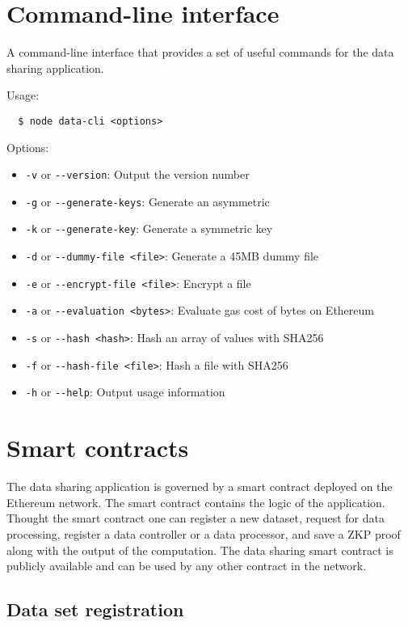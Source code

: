 \section{Command-line interface}
\label{implemenation:cli}

A command-line interface that provides a set of useful commands for the data sharing application.

Usage:

\begin{verbatim}
  $ node data-cli <options>
\end{verbatim}

Options:

\begin{itemize}
  \item \verb|-v| or \verb|--version|: Output the version number
  \item \verb|-g| or \verb|--generate-keys|: Generate an asymmetric
  \item \verb|-k| or \verb|--generate-key|: Generate a symmetric key
  \item \verb|-d| or \verb|--dummy-file <file>|: Generate a 45MB dummy file
  \item \verb|-e| or \verb|--encrypt-file <file>|: Encrypt a file
  \item \verb|-a| or \verb|--evaluation <bytes>|: Evaluate gas cost of bytes on Ethereum
  \item \verb|-s| or \verb|--hash <hash>|: Hash an array of values with SHA256
  \item \verb|-f| or \verb|--hash-file <file>|: Hash a file with SHA256
  \item \verb|-h| or \verb|--help|: Output usage information
\end{itemize}

\section{Smart contracts}
\label{implemenation:contracts}

The data sharing application is governed by a smart contract deployed on the Ethereum network. The smart contract contains the logic of the application. Thought the smart contract one can register a new dataset, request for data processing, register a data controller or a data processor, and save a ZKP proof along with the output of the computation. The data sharing smart contract is publicly available and can be used by any other contract in the network.

\subsection{Data set registration}
\label{implemenation:contracts:data_reg}

